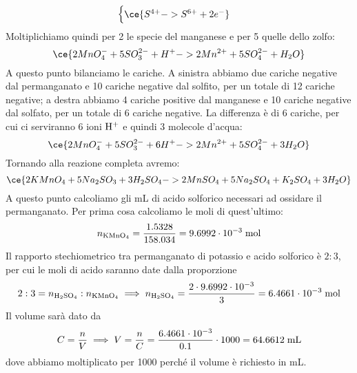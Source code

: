 \begin{soluzione}
\begin{equation*}
\begin{cases}
            \ce{S^{4+} -> S^{6+} + 2e^-}
            \end{cases}
    \end{equation*}
    Moltiplichiamo quindi per 2 le specie del manganese e per 5 quelle dello zolfo:
    \begin{equation*}
        \ce{2MnO_4^- + 5SO_3^{2-} + H^+ -> 2Mn^{2+} + 5SO_4^{2-} + H_2O}
    \end{equation*}
    A questo punto bilanciamo le cariche. A sinistra abbiamo due cariche negative dal permanganato e 10 cariche negative dal solfito, per un totale di 12 cariche negative; a destra abbiamo 4 cariche positive dal manganese e 10 cariche negative dal solfato, per un totale di 6 cariche negative. La differenza è di 6 cariche, per cui ci serviranno 6 ioni $\rm H^+$ e quindi 3 molecole d'acqua:
    \begin{equation*}
        \ce{2MnO_4^- + 5SO_3^{2-} + 6H^+ -> 2Mn^{2+} + 5SO_4^{2-} + 3H_2O}
    \end{equation*}
    Tornando alla reazione completa avremo:
    \begin{equation*}
        \ce{2KMnO_4 + 5Na_2SO_3 + 3H_2SO_4 -> 2MnSO_4 + 5Na_2SO_4 + K_2SO_4 + 3H_2O}
    \end{equation*}
    A questo punto calcoliamo gli mL di acido solforico necessari ad ossidare il permanganato. Per prima cosa calcoliamo le moli di quest'ultimo:
    \begin{equation*}
        n_{\rm KMnO_4}=\frac{1.5328}{158.034}
        =9.6992 \cdot 10^{-3} \; \rm mol
    \end{equation*}
    Il rapporto stechiometrico tra permanganato di potassio e acido solforico è $2:3$, per cui le moli di acido saranno date dalla proporzione
    \begin{equation*}
        2:3=n_{\rm H_2SO_4}:n_{\rm KMnO_4}
        \implies
        n_{\rm H_2SO_4}=\frac{2 \cdot 9.6992 \cdot 10^{-3}}{3}
        =6.4661 \cdot 10^{-3} \; \rm mol
    \end{equation*}
    Il volume sarà dato da
    \begin{equation*}
        C=\frac{n}{V}
        \implies
        V=\frac{n}{C}=\frac{6.4661 \cdot 10^{-3}}{0.1} \cdot 1000
        =64.6612 \; \rm mL
    \end{equation*}
    dove abbiamo moltiplicato per 1000 perché il volume è richiesto in mL.
\end{soluzione}

\newpage

